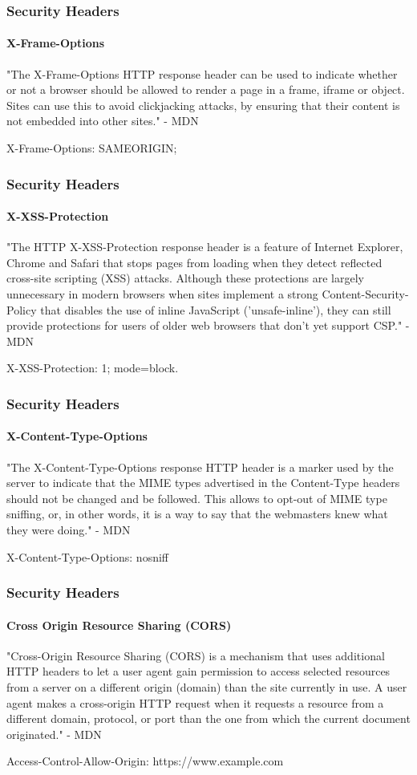 \documentclass[aspectratio=169]{beamer}
\begin{document}
\begin{frame}
  \frametitle{Security Headers}
  \framesubtitle{X-Frame-Options}
  "The X-Frame-Options HTTP response header can be used to indicate whether or not a browser should be allowed to render a page in a frame, iframe or object. Sites can use this to avoid clickjacking attacks, by ensuring that their content is not embedded into other sites." - MDN\\
  \bigskip
  \begin{tcolorbox}[title=X-Frame-Options Header Example,colback=gray]
    X-Frame-Options: SAMEORIGIN;
  \end{tcolorbox}
\end{frame}
\begin{frame}
  \frametitle{Security Headers}
  \framesubtitle{X-XSS-Protection}
  "The HTTP X-XSS-Protection response header is a feature of Internet Explorer, Chrome and Safari that stops pages from loading when they detect reflected cross-site scripting (XSS) attacks. Although these protections are largely unnecessary in modern browsers when sites implement a strong Content-Security-Policy that disables the use of inline JavaScript ('unsafe-inline'), they can still provide protections for users of older web browsers that don't yet support CSP." - MDN\\
  \bigskip
  \begin{tcolorbox}[title=X-XSS-Protection Header Example,colback=gray]
    X-XSS-Protection: 1; mode=block.
  \end{tcolorbox}
\end{frame}
\begin{frame}
  \frametitle{Security Headers}
  \framesubtitle{X-Content-Type-Options}
  "The X-Content-Type-Options response HTTP header is a marker used by the server to indicate that the MIME types advertised in the Content-Type headers should not be changed and be followed. This allows to opt-out of MIME type sniffing, or, in other words, it is a way to say that the webmasters knew what they were doing." - MDN\\
  \bigskip
  \begin{tcolorbox}[title=X-Content-Type-Options Header Example,colback=gray]
    X-Content-Type-Options: nosniff
  \end{tcolorbox}
\end{frame}
\begin{frame}
  \frametitle{Security Headers}
  \framesubtitle{Cross Origin Resource Sharing (CORS)}
  "Cross-Origin Resource Sharing (CORS) is a mechanism that uses additional HTTP headers to let a user agent gain permission to access selected resources from a server on a different origin (domain) than the site currently in use. A user agent makes a cross-origin HTTP request when it requests a resource from a different domain, protocol, or port than the one from which the current document originated." - MDN\\
  \bigskip
  \begin{tcolorbox}[title=Access-Control-Allow-Origin Header Example,colback=gray]
    Access-Control-Allow-Origin: https://www.example.com
  \end{tcolorbox}
\end{frame}
\end{document}
